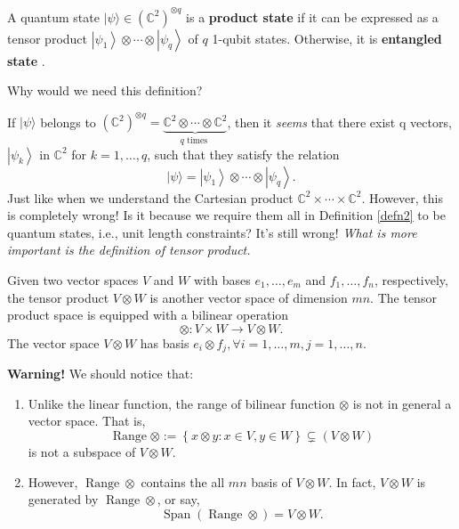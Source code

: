 \begin{definition}\label{defn2}
  A quantum state $|\psi\rangle \in\left(\mathbb{C}^2\right)^{\otimes q}$ is a \textbf{product state} if it can be expressed as a tensor product $\left|\psi_1\right\rangle \otimes \cdots \otimes\left|\psi_q\right\rangle$ of $q$ 1-qubit states. Otherwise, it is \textbf{entangled state }.
\end{definition}

Why would we need this definition?

If $|\psi\rangle$ belongs to $\left(\mathbb{C}^2\right)^{\otimes q}=\underbrace{\mathbb{C}^2 \otimes \cdots \otimes \mathbb{C}^2}_{q \text { times }}$, then it \textit{seems} that there exist q vectors, $\left|\psi_k\right\rangle$ in $\mathbb{C}^2$ for $k=1,\dots,q$, such that they satisfy the relation \begin{equation}
    |\psi\rangle=\left|\psi_1\right\rangle \otimes \cdots \otimes\left|\psi_q\right\rangle.
\end{equation} Just like when we understand the Cartesian product $\mathbb{C}^2 \times \cdots \times \mathbb{C}^2$. However, this is completely wrong!
Is it because we require them all in Definition \ref{defn2} to be quantum states, i.e., unit length constraints? It's still wrong! \textit{What is more important is the definition of tensor product.}

\begin{remark}
    Given two vector spaces $V$ and $W$ with bases $e_1, \ldots, e_m$ and $f_1, \ldots, f_n$, respectively, the tensor product $V \otimes W$ is another vector space of dimension $m n$. The tensor product space is equipped with a bilinear operation \begin{equation}
    \otimes: V \times W \rightarrow V \otimes W.
\end{equation} The vector space $V \otimes W$ has basis $e_i \otimes f_j, \forall i=1, \ldots, m, j=1, \ldots, n$.

    \textbf{Warning!} We should notice that:
    \begin{enumerate}
    \item Unlike the linear function, the range of bilinear function $\otimes$ is not in general a vector space. That is,
            \begin{equation}
    \operatorname{Range} \otimes:= \left\{x \otimes y :x \in V, y \in W \right\} \subsetneq (V \otimes W)
\end{equation} 
            is not a subspace of $V \otimes W$.
    \item However, $\operatorname{Range} \otimes$ contains the all $mn$ basis of $V \otimes W$. In fact, $V \otimes W$ is generated by $\operatorname{Range} \otimes$, or say, \begin{equation}
    \operatorname{Span}(\operatorname{Range} \otimes)=V \otimes W.
\end{equation}
    \end{enumerate}
\end{remark}

